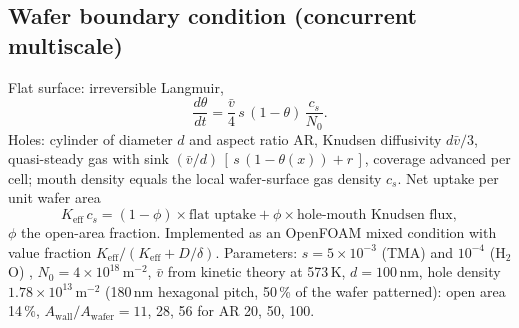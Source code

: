 \documentclass[11pt,letterpaper]{article}
\newcommand{\Awall}{A_{\mathrm{wall}}/A_{\mathrm{wafer}}}
\begin{document}
\subsection{Wafer boundary condition (concurrent multiscale)}
Flat surface: irreversible Langmuir,
\begin{equation}
\frac{d\theta}{dt} = \frac{\bar{v}}{4}\, s\,(1-\theta)\,\frac{c_s}{N_0}.
\end{equation}
Holes: cylinder of diameter $d$ and aspect ratio AR, Knudsen diffusivity $d\bar{v}/3$, quasi-steady gas \cite{ylilammi2018} with sink $(\bar{v}/d)\,[\,s\,(1-\theta(x)) + r\,]$, coverage advanced per cell; mouth density equals the local wafer-surface gas density $c_s$. Net uptake per unit wafer area
\begin{equation}
K_{\mathrm{eff}}\, c_s = (1-\phi)\times\text{flat uptake} + \phi\times\text{hole-mouth Knudsen flux},
\end{equation}
$\phi$ the open-area fraction. Implemented as an OpenFOAM mixed condition with value fraction $K_{\mathrm{eff}}/(K_{\mathrm{eff}} + D/\delta)$. Parameters: $s = 5\times10^{-3}$ (TMA) and $10^{-4}$ (H$_2$O) \cite{arts2019jvsta}, $N_0 = 4\times10^{18}$\,m$^{-2}$, $\bar{v}$ from kinetic theory at 573\,K, $d = 100$\,nm, hole density $1.78\times10^{13}$\,m$^{-2}$ (180\,nm hexagonal pitch, 50\,\% of the wafer patterned): open area 14\,\%, $\Awall = 11$, 28, 56 for AR 20, 50, 100.
\end{document}
